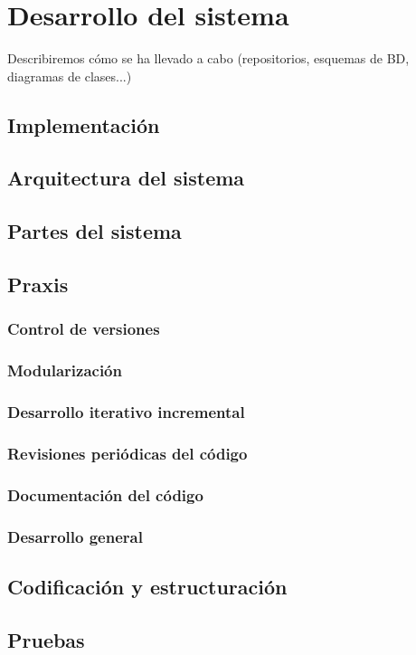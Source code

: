 \chapter{Desarrollo del sistema}

\bigskip
Describiremos cómo se ha llevado a cabo 
(repositorios, esquemas de BD, diagramas de clases...)



\section{Implementación}



\newpage
\section{Arquitectura del sistema}

\newpage
\section{Partes del sistema}

\newpage
\section{Praxis}

\subsection{Control de versiones}

\subsection{Modularización}

\subsection{Desarrollo iterativo incremental}

\subsection{Revisiones periódicas del código}

\subsection{Documentación del código}

\subsection{Desarrollo general}

\newpage
\section{Codificación y estructuración}

\newpage
\section{Pruebas}
